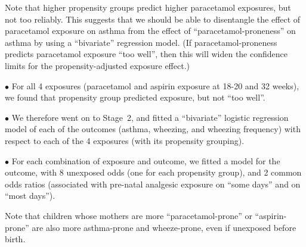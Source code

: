 \endlisting

Note that higher propensity groups predict higher paracetamol exposures, but not
too reliably. This suggests that we should be able to
disentangle the effect of paracetamol exposure on asthma from the effect of ``paracetamol-proneness''
on asthma by using a ``bivariate'' regression model. (If paracetamol-proneness predicts paracetamol
exposure ``too well'', then this will widen the confidence limits for the propensity-adjusted
exposure effect.)

\vfill\eject
\line{}\vfill


\beginitems

\item{$\bullet$} For all 4 exposures (paracetamol and aspirin exposure at 18-20 and
32 weeks), we found that propensity group predicted exposure, but not ``too well''.

\item{$\bullet$} We therefore went on to Stage~2, and fitted a ``bivariate''
logistic regression model of each of the outcomes (asthma, wheezing, and wheezing frequency)
with respect to each of the 4 exposures (with its propensity grouping).

\item{$\bullet$} For each combination of exposure and outcome, we fitted a model
for the outcome, with 8 unexposed odds (one for each propensity group), and 2 common
odds ratios (associated with pre-natal analgesic exposure on ``some days'' and on ``most days'').

\enditems

\vfill\eject
\vfill


\centerline{
}

Note that children whose mothers are more ``paracetamol-prone'' or ``aspirin-prone'' are also more
asthma-prone and wheeze-prone, even if unexposed before birth.

\vfill\eject
\vfill


\centerline{
}

